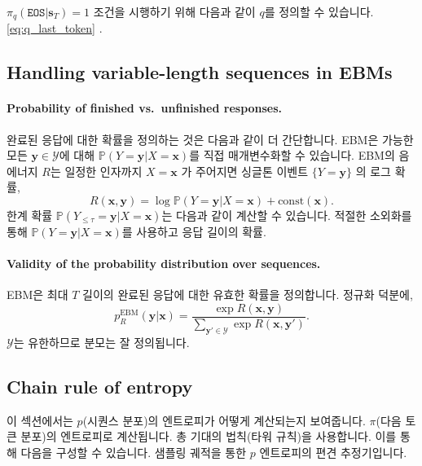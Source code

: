 \documentclass{article}
\def\s{{\bm{s}}}
\def\x{{\bm{x}}}
\def\y{{\bm{y}}}
\def\PP{{\mathbb{P}}}
\def\cY{{\mathcal{Y}}}
\def\eos{\texttt{EOS}\xspace}
\begin{document}
$\pi_q(\eos|\s_T) = 1$ 조건을 시행하기 위해 다음과 같이 $q$를 정의할 수 있습니다.
 \eqref{eq:q_last_token} .





\subsection{Handling variable-length sequences in EBMs} 
 \label{sec:variable_length_handling_ebms}

\paragraph{Probability of finished vs.\ unfinished responses.}

완료된 응답에 대한 확률을 정의하는 것은 다음과 같이 더 간단합니다.
EBM은 가능한 모든 $\y \in
\cY$에 대해 $\PP(Y=\y |X=\x)$를 직접 매개변수화할 수 있습니다.  EBM의 음에너지 $R$는 일정한 인자까지
$X=\x$ 가 주어지면 싱글톤 이벤트 $\{Y=\y\}$ 의 로그 확률, 
 \begin{equation} 
R( \x , \y ) = \log \PP (Y= \y |X= \x ) + \mathrm{const} ( \x ).    
 \end{equation} 
한계 확률 $\PP(Y_{\leq \tau} = \y |X=\x)$는 다음과 같이 계산할 수 있습니다.
 적절한 소외화를 통해 $\PP(Y=\y |X=\x)$를 사용하고
응답 길이의 확률.






\paragraph{Validity of the probability distribution over sequences.}

EBM은 최대 $T$ 길이의 완료된 응답에 대한 유효한 확률을 정의합니다. 
정규화 덕분에,
\[
p^{ \text{EBM} }_R( \y | \x ) = \frac{\exp R(\x, \y)} { \sum _{ \y ' \in \cY } \exp R( \x , \y ')}.
\]
$\cY$는 유한하므로 분모는 잘 정의됩니다.

\subsection{Chain rule of entropy} 
 \label{sec:chain_rule_of_entropy}

이 섹션에서는 $p$(시퀀스 분포)의 엔트로피가 어떻게 계산되는지 보여줍니다.
$\pi$(다음 토큰 분포)의 엔트로피로 계산됩니다.
총 기대의 법칙(타워 규칙)을 사용합니다.  이를 통해 다음을 구성할 수 있습니다.
샘플링 궤적을 통한 $p$ 엔트로피의 편견 추정기입니다.
\end{document}
